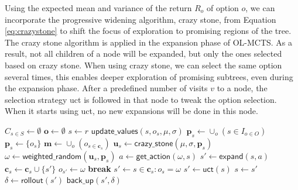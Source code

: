 Using the expected mean and variance of the return $R_o$ of option $o$, we can
incorporate the progressive widening algorithm, crazy stone, from Equation
\ref{eq:crazystone} to shift the focus of exploration to promising regions of
the tree. The crazy stone algorithm is applied in the expansion phase of OL-MCTS.
As a result, not all children of a node will be expanded, but only the ones
selected based on crazy stone. When using crazy stone, we can select the same
option several times, this enables deeper exploration of promising subtrees,
even during the expansion phase. After a predefined number of visits $v$ to a
node, the selection strategy \textsf{uct} is followed in that node to tweak the
option selection. When it starts using \textsf{uct}, no new expansions will be
done in this node.

\begin{algorithm}[h]
	\caption{$\mathsf{OL-MCTS}(O, r, t, d, v, \mu, \sigma)$}
	\label{alg:olmcts}
	\begin{algorithmic}[1]
		\State $C_{s \in S} \gets \emptyset$
		\State $\mathbf{o} \gets \emptyset$
		 \label{alg:olmcts:mainloop}
			\State $s \gets r$
			 \label{alg:olmcts:innerloop}
				 \label{alg:olmcts:sp}
					\State $\mathsf{update\_values}(s, o_s, \mu, \sigma)$
						 \label{alg:olmcts:update}
					\State $\mathbf{p}_s \gets \cup_o (s \in I_{o \in O})$
				\Else
					\State $\mathbf{p}_s \gets \{o_s\}$
				\EndIf \label{alg:olmcts:scs}
				\State $\mathbf{m} \gets \cup_o (o_{s \in \mathbf{c}_s})$
				  
					\label{alg:olmcts:ns}
					\State $\mathbf{u}_s \gets \mathsf{crazy\_stone}(\mu, \sigma, \mathbf{p}_s)$
					\State $\omega \gets \mathsf{weighted\_random}(\mathbf{u}_s, \mathbf{p}_s)$
					 
						\State $a \gets \mathsf{get\_action}(\omega, s)$ \label{alg:olmcts:scs}
						\State $s' \gets \mathsf{expand}(s, a)$ 
						\State $\mathbf{c}_s \gets \mathbf{c}_s \cup \{s'\}$
						\State $o_{s'} \gets \omega$
						\State \textbf{break} \label{alg:olmcts:ecs}
					\Else {}
						\State $s' \gets s \in \mathbf{c}_s : o_s = \omega$ \label{alg:olmcts:s}
					\EndIf
				\Else {}
					\State $s' \gets \mathsf{uct}(s)$ \label{alg:olmcts:uct}
				\EndIf \label{alg:olmcts:ecs}
				\State $s \gets s'$ \label{alg:olmcts:ss}
			\EndWhile
			\State $\delta \gets \mathsf{rollout}(s')$ \label{alg:olmcts:rollout}
			\State $\mathsf{back\_up}(s', \delta)$ \label{alg:olmcts:backup}
		\EndWhile
	\end{algorithmic}
\end{algorithm}

